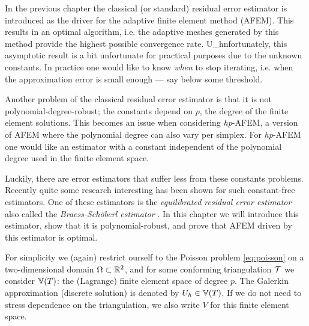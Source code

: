 \documentclass[thesis.tex]{subfiles}
\begin{document}
In the previous chapter the classical (or standard) residual error estimator is introduced as the driver for the
adaptive finite element method (AFEM). This results in an optimal algorithm, i.e. the adaptive meshes
generated by this method provide the highest possible convergence rate. U_hnfortunately, this asymptotic result
is a bit unfortunate for practical purposes due to the unknown constants. In practice
one would like to know \emph{when} to stop iterating, i.e. when the approximation error is small enough --- say
below some threshold. 

Another problem of the classical residual error estimator is that it is not polynomial-degree-robust; 
the constants depend on $p$, the degree of the finite element solutions. This becomes an issue
when considering \emph{hp}-AFEM, a version of AFEM where the polynomial degree can also vary
per simplex. For \emph{hp}-AFEM one would like an estimator with a constant independent of the polynomial degree
used in the finite element space.

Luckily, there are error estimators that suffer less from these constants problems. Recently quite
some research interesting has been shown for such constant-free estimators. One of these estimators is the
\emph{equilibrated residual error estimator} also called the \emph{Braess-Sch\"oberl estimator} \cite{braessequil, braessequilrobust,ernequil}.
In this chapter we will introduce this estimator, show that it is polynomial-robust, and prove that AFEM driven 
by this estimator is optimal.

For simplicity we (again) restrict ourself to the Poisson problem \eqref{eq:poisson} on a two-dimensional domain $\Omega \subset \mathbb{R}^2$,
and for some conforming triangulation $\mathcal{T}$ we consider $\mathbb{V}(T)$: the (Lagrange) finite element space of degree $p$.
The Galerkin approximation (discrete solution) is denoted by $U_h \in \mathbb{V}(T)$. If we do not need to stress dependence on the triangulation, we 
also write $V$ for this finite element space.
\end{document}
